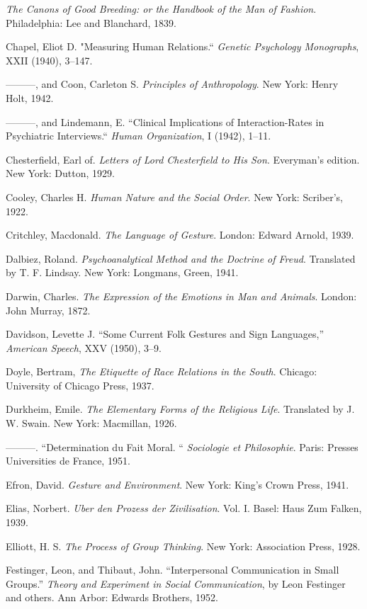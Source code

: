 \documentclass[twoside,symmetric,nobib,justified]{tufte-book}
\begin{document}
\begin{hangparas}{.25in}{1}
\emph{The Canons of Good Breeding: or the Handbook of the Man of
Fashion}. Philadelphia: Lee and Blanchard, 1839.

Chapel, Eliot D. "Measuring Human Relations.`` \emph{Genetic Psychology
Monographs}, XXII (1940), 3--147.

---------, and Coon, Carleton S. \emph{Principles of Anthropology}. New
York: Henry Holt, 1942.

---------, and Lindemann, E. ``Clinical Implications of
Interaction-Rates in Psychiatric Interviews.`` \emph{Human
Organization}, I (1942), 1--11.

Chesterfield, Earl of. \emph{Letters of Lord Chesterfield to His Son}.
Everyman's edition. New York: Dutton, 1929.

Cooley, Charles H. \emph{Human Nature and the Social Order}. New York:
Scriber's, 1922.

Critchley, Macdonald. \emph{The Language of Gesture}. London: Edward
Arnold, 1939.

Dalbiez, Roland. \emph{Psychoanalytical Method and the Doctrine of
Freud}. Translated by T. F. Lindsay. New York: Longmans, Green, 1941.

Darwin, Charles. \emph{The Expression of the Emotions in Man and
Animals}. London: John Murray, 1872.

Davidson, Levette J. ``Some Current Folk Gestures and Sign Languages,''
\emph{American Speech}, XXV (1950), 3--9.

Doyle, Bertram, \emph{The Etiquette of Race Relations in the South}.
Chicago: University of Chicago Press, 1937.

Durkheim, Emile. \emph{The Elementary Forms of the Religious Life}.
Translated by J. W. Swain. New York: Macmillan, 1926.

---------. ``Determination du Fait Moral. `` \emph{Sociologie et
Philosophie}. Paris: Presses Universities de France, 1951.

Efron, David. \emph{Gesture and Environment}. New York: King's Crown
Press, 1941.

Elias, Norbert. \emph{Uber den Prozess der Zivilisation}. Vol. I. Basel:
Haus Zum Falken, 1939.

Elliott, H. S. \emph{The Process of Group Thinking}. New York:
Association Press, 1928.

Festinger, Leon, and Thibaut, John. ``Interpersonal Communication in
Small Groups.'' \emph{Theory and Experiment in Social Communication}, by
Leon Festinger and others. Ann Arbor: Edwards Brothers, 1952.


\end{hangparas}
\end{document}
